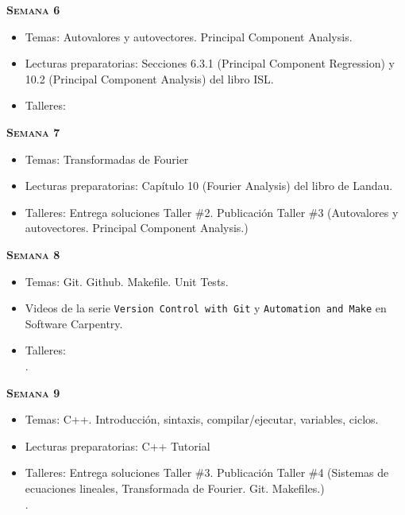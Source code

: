 \documentclass[letterpaper,10pt,onecolumn]{article}
\begin{document}
\noindent\textbf{\textsc{Semana 6}}\\[-0.5cm]
\begin{itemize}
\item Temas: Autovalores y autovectores. Principal Component
  Analysis. \\[-0.6cm]
\item Lecturas preparatorias: Secciones 6.3.1 (Principal Component
  Regression) y 10.2 (Principal Component Analysis) del libro ISL.\\[-0.6cm]
\item Talleres: \\[-0.6cm]
\end{itemize}

\noindent\textbf{\textsc{Semana 7}}\\[-0.5cm]
\begin{itemize}
\item Temas: Transformadas de Fourier\\[-0.6cm]
\item Lecturas preparatorias: Cap\'itulo 10 (Fourier Analysis) del
  libro de Landau.\\[-0.6cm] 
\item Talleres: 
Entrega soluciones Taller \#2. 
Publicaci\'on Taller \#3
(Autovalores y
autovectores. Principal Component Analysis.)
\\[-0.6cm]
\end{itemize}

\noindent\textbf{\textsc{Semana 8}}\\[-0.5cm]
\begin{itemize}
\item Temas: Git. Github. Makefile. Unit Tests. \\[-0.6cm]
\item Videos de la serie \texttt{Version Control with Git} y
  \texttt{Automation  and Make}  en Software Carpentry.\\[-0.6cm]    
\item Talleres:\\[-0.6cm]. 
\end{itemize}

\noindent\textbf{\textsc{Semana 9}}\\[-0.5cm]
\begin{itemize}
\item Temas: C++. Introducción, sintaxis, compilar/ejecutar,
variables, ciclos. \\[-0.6cm]
\item Lecturas preparatorias: C++ Tutorial\\[-0.6cm]
\item Talleres: 
Entrega soluciones Taller \#3. 
Publicaci\'on Taller \#4 
(Sistemas de ecuaciones lineales, Transformada de Fourier. Git. Makefiles.)
\\[-0.6cm]. 
\end{itemize}
\end{document}
